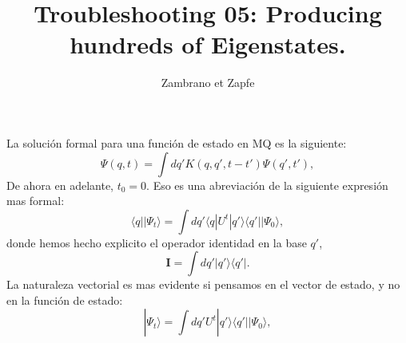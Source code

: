 \documentclass[a4paper,12pt]{article}
\title{Troubleshooting 05: Producing hundreds of Eigenstates. }
\author{Zambrano et Zapfe}
\newcommand{\Ifase}{\mathbf{I}}
\newcommand{\bra}[1]{\langle #1|}
\newcommand{\ket}[1]{|#1\rangle}
\begin{document}
La solución formal para una función de estado en MQ es la siguiente:
\begin{equation}
\Psi(q,t)=\int dq' K(q,q', t-t') \Psi(q',t'),
\end{equation}
De ahora en adelante,  $t_0=0$.
Eso es una abreviación de la siguiente expresión mas formal:
\begin{equation}\label{evolbien}
\bra{q}\ket{\Psi_t}=\int dq' \bra{q}U^t\ket{q'}\bra{q'}\ket{\Psi_0},
\end{equation}
donde hemos hecho explicito el operador identidad en la base $q'$, 
\begin{equation}
\Ifase=\int dq' \ket{q'}\bra{q'}.
\end{equation}
La naturaleza vectorial es mas evidente si pensamos en el vector de
estado, y no en la función de estado:
\begin{equation}
\ket{\Psi_t}=\int dq' U^t\ket{q'}\bra{q'}\ket{\Psi_0},
\end{equation}
\end{document}
